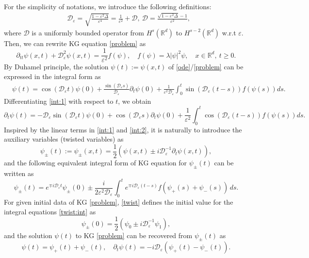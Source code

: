 \documentclass[final,leqno,showlabe]{siamltex}
\begin{document}
For the simplicity of notations,  we introduce the following definitions:
\begin{align}\label{deco}
&\mathcal{D}_{\varepsilon}=\sqrt{\frac{1-\varepsilon^2\Delta}{\varepsilon^4}}=\frac{1}{\varepsilon^2}+\mathcal{D},\ \mathcal{D}=\frac{\sqrt{1-\varepsilon^2\Delta}-1}{\varepsilon^2},
\end{align}
where $\mathcal{D}$ is a uniformly bounded operator from $H^s(\mathbb{R}^d)$ to $H^{s-2}(\mathbb{R}^d)$ w.r.t $\varepsilon$. Then, we can rewrite KG equation \eqref{problem} as
\begin{equation}\label{ode}
\partial_{tt}\psi(x,t)+\mathcal{D}_{\varepsilon}^2\psi(x,t)=\frac{1}{\varepsilon^2}f(\psi),\quad f(\psi)=\lambda|\psi|^2\psi,\quad  x\in\mathbb{R}^d,\ t\geq 0.
\end{equation}
By Duhamel principle, the solution $\psi(t):=\psi(x,t)$ of \eqref{ode}/\eqref{problem} can be expressed in the integral form as
\begin{align}\label{int:1}
&\psi(t)=\cos{(\mathcal{D}_{\varepsilon}t)}\psi(0)+\frac{\sin{(\mathcal{D}_{\varepsilon}s)}}{\mathcal{D}_{\varepsilon}}\partial_t\psi(0)
+\frac{1}{\varepsilon^2\mathcal{D}_{\varepsilon}}\int_{0}^{t}\sin{(\mathcal{D}_{\varepsilon}(t-s))}f(\psi(s))ds.\end{align}
Differentiating \eqref{int:1} with respect to $t$, we obtain
\begin{equation}\label{int:2}
\partial_t\psi(t)=-\mathcal{D}_{\varepsilon}\sin{(\mathcal{D}_{\varepsilon}t)}\psi(0)+\cos{(\mathcal{D}_{\varepsilon}s)}\partial_t\psi(0)
+\frac{1}{\varepsilon^2}\int_{0}^{t}\cos{(\mathcal{D}_{\varepsilon}(t-s))}f(\psi(s))ds.
\end{equation}
Inspired by the linear terms in \eqref{int:1} and \eqref{int:2}, it is naturally to introduce the auxiliary variables (twisted variables) as
\begin{equation}\label{twist}
\psi_\pm(t):=\psi_{\pm}(x,t)=\frac{1}{2}\left(\psi(x,t)\pm i \mathcal{D}_{\varepsilon}^{-1}\partial_t\psi(x,t)\right),
\end{equation}
and the following equivalent integral form of KG equation for $\psi_\pm(t)$ can be written as
\begin{equation}\label{twist:int}
\psi_\pm(t)=e^{\mp i\mathcal{D}_{\varepsilon} t}\psi_{\pm}(0)\pm \frac{i}{2\varepsilon^2\mathcal{D}_{\varepsilon} }\int_0^t e^{\mp i \mathcal{D}_\varepsilon (t-s)} f(\psi_+(s)+\psi_-(s))\,ds.
\end{equation}
For given initial data of KG \eqref{problem},  \eqref{twist} defines the initial value for the integral equations \eqref{twist:int} as
\begin{equation}\label{psi:data}
\psi_\pm(0)=\frac{1}{2}\left(\psi_0\pm i\mathcal{D}_{\varepsilon}^{-1}\psi_1\right),
\end{equation}
and the solution $\psi(t)$ to KG \eqref{problem} can be recovered from $\psi_\pm(t)$ as
\begin{equation}\label{relation}
\psi(t)=\psi_+(t)+\psi_-(t),
\quad \partial_t\psi(t)=-i\mathcal{D}_{\varepsilon}\left(\psi_+(t)-\psi_-(t)\right).
\end{equation}
\end{document}
